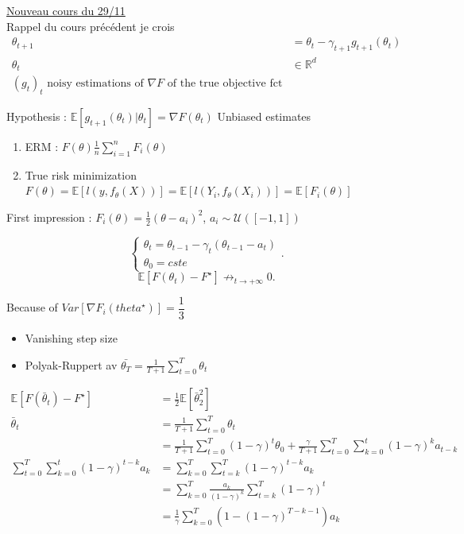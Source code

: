 \underline{Nouveau cours du 29/11} \\ 

Rappel du cours précédent je crois 
\begin{align*}
    \theta _{t+1} &= \theta _t - \gamma _{t+1} g_{t+1} (\theta _t) \\
    \theta _t &\in \mathbb{R}^d \\
    (g_t)_t \text{ noisy estimations of } \nabla F \text{ of the true objective fct}
\end{align*}

Hypothesis : $ \mathbb{E}[g_{t+1} ( \theta _t) | \theta _t] = \nabla F(\theta _t) $ Unbiased estimates
\begin{enumerate}
    \item ERM : $ F(\theta ) \frac{1}{n} \sum_{i=1}^{n} F_i (\theta ) $ 
    \item True risk minimization $ F(\theta ) = \mathbb{E}[l(y, f_\theta (X))] = \mathbb{E}[l(Y_i, f_\theta (X_i))] = \mathbb{E}[F_i(\theta )]$ 
\end{enumerate}

First impression : $ F_i (\theta )  = \frac{1}{2} (\theta - a_i)^2 $, $ a_i \sim \mathcal{U}([-1, 1]) $

\[
    \begin{cases}
        \theta _t = \theta _{t-1} - \gamma _t (\theta _{t-1} - a_t) \\
        \theta _0 = cste
    \end{cases} 
.\]
\[
    \mathbb{E}[F(\theta _t) - F^\star ] \not\to_ {t \to +\infty } 0
.\]



Because of $Var[ \nabla F_i (theta ^{\star })] = \dfrac{1}{3}$
\begin{itemize}
    \item Vanishing step size
    \item Polyak-Ruppert av $\bar{\theta _T} = \frac{1}{T+1} \sum_{t=0}^{T} \theta _t$
\end{itemize}


\begin{align*}
    \mathbb{E}[F(\bar{\theta }_t) - F^\star ] &= \frac{1}{2}\mathbb{E}[\bar{\theta }_2 ^2] \\
    \bar{\theta }_t 
        &= \frac{1}{T+1} \sum_{t=0}^{T} \theta _t \\
        &= \frac{1}{T+1} \sum_{t=0}^{T} (1 - \gamma )^t \theta _0 + \frac{\gamma }{T+1} \sum_{t=0}^{T} \sum_{k=0}^{t} (1 - \gamma ) ^k a _ {t-k} \\
    \sum_{t=0}^{T}\sum_{k=0}^{t} (1 - \gamma ) ^{t-k} a_k 
        &= \sum_{k=0}^{T} \sum_{t=k}^{T} (1 - \gamma )^{t-k} a_k \\
        &= \sum_{k=0}^{T} \frac{a_k}{(1-\gamma )^k} \sum_{t=k}^{T}(1 - \gamma )^t \\
        &= \frac{1}{\gamma } \sum_{k=0}^{T} (1 - (1 - \gamma ) ^{ T -k -1} )a_k
\end{align*}




